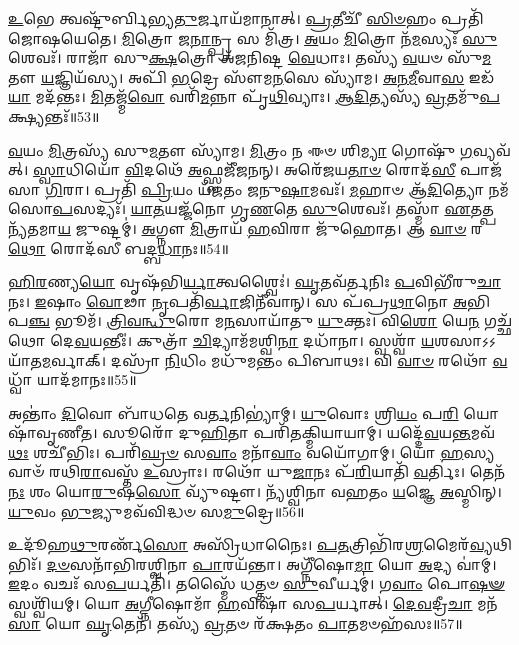 \-\ul{𑌉}\-𑌭𑍇 𑌤𑍍𑌵𑌷𑍍𑌟𑍁᳴𑌰𑍍𑌬𑌿𑌭𑍍𑌯\-\ul{𑌤𑍁}\-𑌰𑍍𑌜𑌾𑌯᳴𑌮𑌾𑌨𑌾𑌤𑍍।
\-\ul{𑌪𑍍𑌰}\-𑌤𑍀𑌚𑍀᳴ \ul{𑌸𑌿}\-\-\ul{𑍞}\-𑌹𑌂 𑌪𑍍𑌰𑌤𑌿᳴\-𑌜𑍋𑌷𑌯𑍇𑌤𑍇।
\-\ul{𑌮𑌿}\-𑌤𑍍𑌰𑍋 𑌜\-\ul{𑌨𑌾}\-𑌨𑍍𑌪𑍍𑌰 𑌸 𑌮𑌿᳴𑌤𑍍𑌰।
\-\ul{𑌅}\-𑌯𑌂 \ul{𑌮𑌿}\-𑌤𑍍𑌰𑍋 𑌨᳴\-\ul{𑌮}\-𑌸𑍍𑌯𑌃᳴ \ul{𑌸𑍁}\-𑌶𑍇𑌵𑌃᳴।
𑌰𑌾𑌜𑌾᳴ 𑌸𑍁\-\ul{𑌕𑍍𑌷}\-𑌤𑍍𑌰𑍋 𑌅᳴𑌜𑌨𑌿𑌷𑍍𑌟 \ul{𑌵𑍇}\-𑌧𑌾𑌃।
𑌤𑌸𑍍𑌯᳴ \ul{𑌵}\-𑌯𑍞 𑌸𑍁᳴\-\ul{𑌮}\-𑌤𑍗 \ul{𑌯}\-𑌜𑍍𑌞𑌿𑌯᳴𑌸𑍍𑌯।
𑌅𑌪𑌿᳴ \ul{𑌭}\-𑌦𑍍𑌰𑍇 𑌸𑍗᳴𑌮\-\ul{𑌨}\-𑌸𑍇 𑌸𑍍𑌯𑌾᳴𑌮।
\-\ul{𑌅}\-\-\ul{𑌨}\-\-\ul{𑌮𑍀}\-𑌵𑌾\-\ul{𑌸} 𑌇𑌡᳴\-\ul{𑌯𑌾} 𑌮𑌦᳴𑌨𑍍𑌤𑌃।
\-\ul{𑌮𑌿}\-𑌤𑌜𑍍𑌮᳴\-\ul{𑌵𑍋} 𑌵𑌰𑌿᳴\-\ul{𑌮}\-𑌨𑍍𑌨𑌾 𑌪𑍃᳴\-\ul{𑌥𑌿}\-𑌵𑍍𑌯𑌾𑌃।
\-\ul{𑌆}\-\-\ul{𑌦𑌿}\-𑌤𑍍𑌯𑌸𑍍𑌯᳴ \ul{𑌵𑍍𑌰}\-𑌤𑌮𑍁᳴\-\ul{𑌪}\-𑌕𑍍𑌷𑍍𑌯𑌨𑍍𑌤𑌃᳴॥53॥

\-\ul{𑌵}\-𑌯𑌂 \ul{𑌮𑌿}\-𑌤𑍍𑌰𑌸𑍍𑌯᳴ 𑌸𑍁\-\ul{𑌮}\-𑌤𑍗 𑌸𑍍𑌯𑌾᳴𑌮।
\-\ul{𑌮𑌿}\-𑌤𑍍𑌰𑌂 𑌨 𑌈𑍞 𑌶𑌿\-\ul{𑌮𑍍𑌯𑌾} 𑌗𑍋𑌷𑍁᳴ \ul{𑌗}\-𑌵𑍍𑌯𑌵᳴𑌤𑍍।
\-\ul{𑌸𑍍𑌵𑌾}\-𑌧𑌿𑌯𑍋᳴ \ul{𑌵𑌿}\-𑌦𑌥𑍇᳴ \ul{𑌅}\-𑌫𑍍𑌸𑍍𑌵𑌜𑍀᳴𑌜𑌨𑌨𑍍।
𑌅𑌰𑍇᳴𑌜𑌯\-\ul{𑌤𑌾}\-\-\ul{𑍞} 𑌰𑍋𑌦᳴\-\ul{𑌸𑍀} 𑌪𑌾𑌜᳴𑌸𑌾 \ul{𑌗𑌿}\-𑌰𑌾।
𑌪𑍍𑌰𑌤𑌿᳴ \ul{𑌪𑍍𑌰𑌿}\-𑌯𑌂 𑌯᳴\-\ul{𑌜}\-𑌤𑌂 \ul{𑌜}\-𑌨𑍁\-\ul{𑌷𑌾}\-𑌮𑌵𑌃᳴।
\-\ul{𑌮}\-𑌹𑌾𑍞 𑌆᳴\-\ul{𑌦𑌿}\-𑌤𑍍𑌯𑍋 𑌨𑌮᳴𑌸𑍋\-\ul{𑌪}\-𑌸𑌦𑍍𑌯𑌃᳴।
\-\ul{𑌯𑌾}\-\-\ul{𑌤}\-𑌯𑌜𑍍𑌜᳴𑌨𑍋 𑌗𑍃\-\ul{𑌣}\-𑌤𑍇 \ul{𑌸𑍁}\-𑌶𑍇𑌵𑌃᳴।
𑌤𑌸𑍍𑌮𑌾᳴ \ul{𑌏}\-𑌤𑌤𑍍𑌪𑌨𑍍𑌯᳴𑌤𑌮𑌾\-\ul{𑌯} 𑌜𑍁𑌷𑍍𑌟𑌮𑍍॑।
\-\ul{𑌅}\-𑌗𑍍𑌨𑍗 \ul{𑌮𑌿}\-𑌤𑍍𑌰𑌾𑌯᳴ \ul{𑌹}\-𑌵𑌿𑌰𑌾 𑌜𑍁᳴𑌹𑍋𑌤।
𑌆 \ul{𑌵𑌾}\-\-\ul{𑍞} 𑌰\-\ul{𑌥𑍋} 𑌰𑍋𑌦᳴𑌸𑍀 𑌬𑌦𑍍𑌬\-\ul{𑌧𑌾}\-𑌨𑌃॥54॥

\-\ul{𑌹𑌿}\-\-\ul{𑌰}\-𑌣𑍍𑌯\-\ul{𑌯𑍋} 𑌵𑍃𑌷᳴𑌭𑌿\-\ul{𑌰𑍍𑌯𑌾}\-𑌤𑍍𑌵𑌶𑍍𑌵𑍈𑌃॑।
\-\ul{𑌘𑍃}\-𑌤𑌵᳴𑌰𑍍𑌤𑌨𑌿𑌃 \ul{𑌪}\-𑌵𑌿𑌭𑍀᳴𑌰𑍁\-\ul{𑌚𑌾}\-𑌨𑌃।
\-\ul{𑌇}\-𑌷𑌾𑌂 \ul{𑌵𑍋}\-𑌢𑌾 \ul{𑌨𑍃}\-𑌪𑌤𑌿᳴\-\ul{𑌰𑍍𑌵𑌾}\-𑌜𑌿𑌨𑍀᳴𑌵𑌾𑌨𑍍।
𑌸 𑌪᳴𑌪𑍍𑌰\-\ul{𑌥𑌾}\-𑌨𑍋 \ul{𑌅}\-𑌭𑌿 𑌪\-\ul{𑌞𑍍𑌚} 𑌭𑍂𑌮᳴।
\-\ul{𑌤𑍍𑌰𑌿}\-\-\ul{𑌵}\-\-\ul{𑌨𑍍𑌧𑍁}\-𑌰𑍋 𑌮\-\ul{𑌨}\-𑌸𑌾𑌯𑌾᳴𑌤𑍁 \ul{𑌯𑍁}\-𑌕𑍍𑌤𑌃।
𑌵𑌿\-\ul{𑌶𑍋} 𑌯𑍇\-\ul{𑌨} 𑌗𑌚𑍍𑌛᳴𑌥𑍋 𑌦𑍇\-\ul{𑌵}\-𑌯𑌨𑍍𑌤𑍀𑌃॑।
𑌕𑍁𑌤𑍍𑌰𑌾᳴ \ul{𑌚𑌿}\-𑌦𑍍𑌯𑌾𑌮᳴𑌮𑌶𑍍𑌵𑌿\-\ul{𑌨𑌾} 𑌦𑌧𑌾᳴𑌨𑌾।
𑌸𑍍𑌵𑌶𑍍𑌵𑌾᳴ \ul{𑌯}\-𑌶𑌸𑌾\-𑌽𑌽𑌯𑌾᳴𑌤\-\ul{𑌮}\-𑌰𑍍𑌵𑌾𑌕𑍍।
𑌦𑌸𑍍𑌰𑌾᳴ \ul{𑌨𑌿}\-𑌧𑌿𑌂 𑌮𑌧𑍁᳴𑌮𑌨𑍍𑌤𑌂 𑌪𑌿𑌬𑌾𑌥𑌃।
𑌵𑌿 \ul{𑌵𑌾}\-\-\ul{𑍞} 𑌰𑌥𑍋᳴ \ul{𑌵}\-𑌧𑍍𑌵𑌾᳴ 𑌯𑌾𑌦᳴𑌮𑌾𑌨𑌃॥55॥

𑌅𑌨𑍍𑌤𑌾𑌂॑ \ul{𑌦𑌿}\-𑌵𑍋 𑌬𑌾᳴𑌧𑌤𑍇 𑌵\-\ul{𑌰𑍍𑌤}\-𑌨𑌿𑌭𑍍𑌯𑌾॑𑌮𑍍।
\-\ul{𑌯𑍁}\-𑌵𑍋𑌃 𑌶𑍍𑌰𑌿\-\ul{𑌯𑌂} 𑌪\-\ul{𑌰𑌿} 𑌯𑍋𑌷𑌾᳴𑌵𑍃𑌣𑍀𑌤।
𑌸𑍂𑌰𑍋᳴ 𑌦𑍁\-\ul{𑌹𑌿}\-𑌤𑌾 𑌪𑌰𑌿᳴𑌤𑌕𑍍𑌮𑌿𑌯𑌾𑌯𑌾𑌮𑍍।
𑌯𑌦𑍍𑌦𑍇᳴\-\ul{𑌵}\-𑌯\-\ul{𑌨𑍍𑌤}\-𑌮𑌵᳴\-\ul{𑌥𑌃} 𑌶𑌚𑍀᳴𑌭𑌿𑌃।
𑌪𑌰𑌿᳴\-\ul{𑌘𑍍𑌰}\-\-\ul{𑍞} 𑌸\-\ul{𑌵𑌾𑌂} 𑌮𑌨𑌾᳴\-\ul{𑌵𑌾𑌂} 𑌵𑌯𑍋᳴𑌗𑌾𑌮𑍍।
𑌯𑍋 \ul{𑌹}\-𑌸𑍍𑌯𑌵𑌾𑍞᳴ 𑌰𑌥𑌿\-\ul{𑌰𑌾}\-𑌵𑌸𑍍𑌤᳴ \ul{𑌉}\-𑌸𑍍𑌰𑌾𑌃।
𑌰𑌥𑍋᳴ 𑌯𑍁\-\ul{𑌜𑌾}\-𑌨𑌃 𑌪᳴\-\ul{𑌰𑌿}\-𑌯𑌾𑌤𑌿᳴ \ul{𑌵}\-𑌰𑍍𑌤𑌿𑌃।
𑌤𑍇𑌨᳴ \ul{𑌨𑌃} 𑌶𑌂 𑌯𑍋\-\ul{𑌰𑍁}\-𑌷\-\ul{𑌸𑍋} 𑌵𑍍𑌯𑍁᳴𑌷𑍍𑌟𑍗।
𑌨𑍍𑌯᳴𑌶𑍍𑌵𑌿𑌨𑌾 𑌵𑌹𑌤𑌂 \ul{𑌯}\-𑌜𑍍𑌞𑍇 \ul{𑌅}\-𑌸𑍍𑌮𑌿𑌨𑍍।
\-\ul{𑌯𑍁}\-𑌵𑌂 \ul{𑌭𑍁}\-𑌜𑍍𑌯𑍁𑌮𑌵᳴𑌵𑌿𑌦𑍍𑌧𑍞 𑌸\-\ul{𑌮𑍁}\-𑌦𑍍𑌰𑍇॥56॥

𑌉𑌦𑍂᳴𑌹\-\ul{𑌥𑍁}\-𑌰𑌰𑍍𑌣᳴\-\ul{𑌸𑍋} 𑌅𑌸𑍍𑌰𑌿᳴𑌧𑌾𑌨𑍈𑌃।
\-\ul{𑌪}\-\-\ul{𑌤}\-𑌤𑍍𑌰𑌿𑌭𑌿᳴𑌰\-\ul{𑌶𑍍𑌰}\-𑌮𑍈𑌰᳴\-\ul{𑌵𑍍𑌯}\-𑌥𑌿𑌭𑌿𑌃᳴।
\-\ul{𑌦}\-\-\ul{𑍞}\-𑌸𑌨𑌾᳴𑌭𑌿𑌰𑌶𑍍𑌵𑌿𑌨𑌾 \ul{𑌪𑌾}\-𑌰𑌯᳴𑌨𑍍𑌤𑌾।
𑌅𑌗𑍍𑌨𑍀᳴𑌷𑍋\-\ul{𑌮𑌾} 𑌯𑍋 \ul{𑌅}\-𑌦𑍍𑌯 𑌵𑌾॑𑌮𑍍।
\-\ul{𑌇}\-𑌦𑌂 𑌵𑌚𑌃᳴ 𑌸\-\ul{𑌪}\-𑌰𑍍𑌯𑌤𑌿᳴।
𑌤𑌸𑍍𑌮𑍈᳴ 𑌧𑌤𑍍𑌤𑍞 \ul{𑌸𑍁}\-𑌵𑍀𑌰𑍍𑌯𑌮𑍍॑।
𑌗\-\ul{𑌵𑌾𑌂} 𑌪𑍋\-\ul{𑌷}\-\-\ul{𑍟} 𑌸𑍍𑌵𑌶𑍍𑌵𑌿᳴𑌯𑌮𑍍।
𑌯𑍋 \ul{𑌅}\-𑌗𑍍𑌨𑍀𑌷𑍋𑌮𑌾᳴ \ul{𑌹}\-𑌵𑌿𑌷𑌾᳴ 𑌸\-\ul{𑌪}\-𑌰𑍍𑌯𑌾𑌤𑍍।
\-\ul{𑌦𑍇}\-\-\ul{𑌵}\-𑌦𑍍𑌰𑍀\-\ul{𑌚𑌾} 𑌮𑌨᳴\-\ul{𑌸𑌾} 𑌯𑍋 \ul{𑌘𑍃}\-𑌤𑍇𑌨᳴।
𑌤𑌸𑍍𑌯᳴ \ul{𑌵𑍍𑌰}\-𑌤𑍞 𑌰᳴𑌕𑍍𑌷𑌤𑌂 \ul{𑌪𑌾}\-𑌤𑌮𑍞𑌹᳴𑌸𑌃॥57॥


